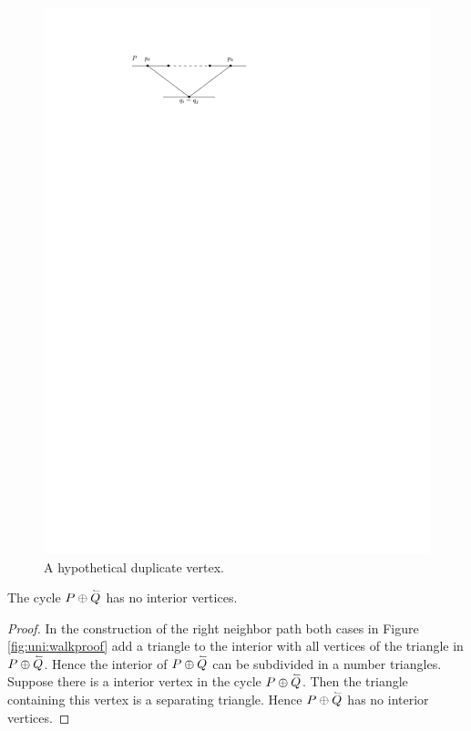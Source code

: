     \begin{figure}[h]
      \centering
      \includegraphics[scale=1]{unifiedAlgo/img/rightNeighbourwalk/neighborPathisPath.pdf}
      \caption{A hypothetical duplicate vertex.}
      \label{fig:right:path}
    \end{figure}

    \begin{lemma}
      \label{lm:right:neighbourwalkNoInteriorVertex}
      The cycle $P \oplus \accentset{\leftharpoonup}{Q}$ has no interior vertices.
    \end{lemma}
    \begin{proof}
      In the construction of the right neighbor path both cases in Figure \ref{fig:uni:walkproof} add a triangle to the interior with all vertices of the triangle in $P \oplus \accentset{\leftharpoonup}{Q}$. Hence the interior of $P \oplus \accentset{\leftharpoonup}{Q}$ can be subdivided in a number triangles.
      Suppose there is a interior vertex in the cycle $P \oplus \accentset{\leftharpoonup}{Q}$. Then the triangle containing this vertex is a separating triangle. Hence $P \oplus \accentset{\leftharpoonup}{Q}$ has no interior vertices.
    \end{proof}


